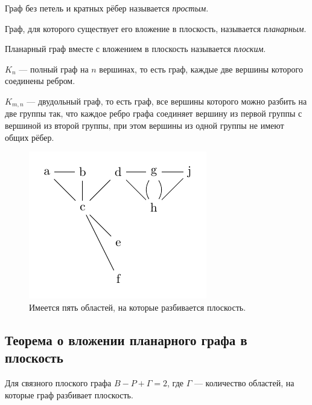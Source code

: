 \begin{definition}
    Граф без петель и кратных рёбер называется \textit{простым}.
\end{definition}

\begin{definition}
    Граф, для которого существует его вложение в плоскость, называется \textit{планарным}.
\end{definition}

\begin{definition}
    Планарный граф вместе с вложением в плоскость называется \textit{плоским}.
\end{definition}

\begin{definition}
    $K_n$ — полный граф на $n$ вершинах, то есть граф, каждые две вершины которого соединены ребром.

    $K_{m,n}$ — двудольный граф, то есть граф, все вершины которого можно разбить на две группы так, что каждое ребро графа соединяет вершину из первой группы с вершиной из второй группы, при этом вершины из одной группы не имеют общих рёбер.
\end{definition}

\begin{figure}[h]
    \centering
    \includegraphics[scale=2]{images/c3.5.pdf}
    \caption{Имеется пять областей, на которые разбивается плоскость.}
    \label{fig:c3.5}
\end{figure}


\subsection{Теорема о вложении планарного графа в плоскость}

\begin{theorem}
    Для связного плоского графа $B - P + \Gamma = 2$, где $\Gamma$ — количество областей, на которые граф разбивает плоскость.
\end{theorem}

